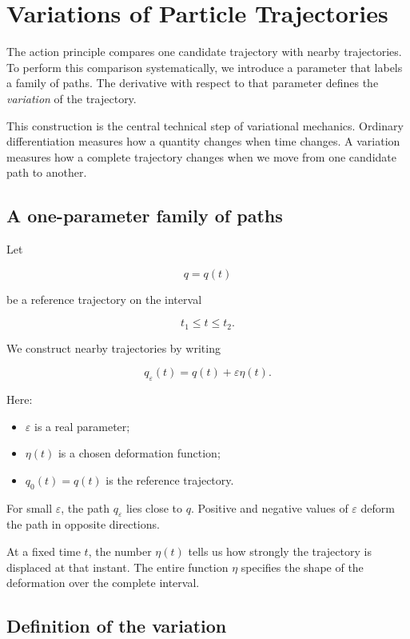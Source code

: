 \section{Variations of Particle Trajectories}
\label{sec:variations_of_particle_trajectories}

The action principle compares one candidate trajectory with nearby trajectories. To perform this comparison systematically, we introduce a parameter that labels a family of paths. The derivative with respect to that parameter defines the \emph{variation} of the trajectory.

This construction is the central technical step of variational mechanics. Ordinary differentiation measures how a quantity changes when time changes. A variation measures how a complete trajectory changes when we move from one candidate path to another.

\subsection{A one-parameter family of paths}

Let

\[
q=q(t)
\]

be a reference trajectory on the interval

\[
t_{1}\leq t\leq t_{2}.
\]

We construct nearby trajectories by writing

\[
\boxed{
q_{\varepsilon}(t)
=
q(t)+\varepsilon\eta(t)
}.
\]

Here:

\begin{itemize}
    \item \(\varepsilon\) is a real parameter;
    \item \(\eta(t)\) is a chosen deformation function;
    \item \(q_{0}(t)=q(t)\) is the reference trajectory.
\end{itemize}

For small \(\varepsilon\), the path \(q_{\varepsilon}\) lies close to \(q\). Positive and negative values of \(\varepsilon\) deform the path in opposite directions.

At a fixed time \(t\), the number \(\eta(t)\) tells us how strongly the trajectory is displaced at that instant. The entire function \(\eta\) specifies the shape of the deformation over the complete interval.

\subsection{Definition of the variation}

